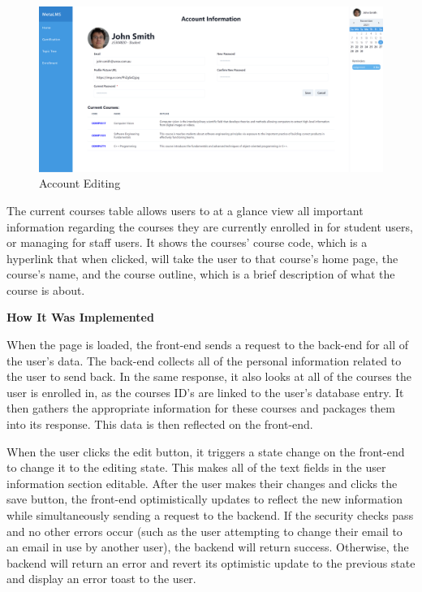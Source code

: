 \begin{figure}[h!]
    \centering
    \includegraphics[scale=0.1]{images/accounts-account-management-edit.png}
    \caption{Account Editing}
\end{figure}

The current courses table allows users to at a glance view all important information regarding the courses they are currently enrolled in for student users, or managing for staff users. It shows the courses' course code, which is a hyperlink that when clicked, will take the user to that course's home page, the course's name, and the course outline, which is a brief description of what the course is about.

\textbf{How It Was Implemented}

When the page is loaded, the front-end sends a request to the back-end for all of the user's data. The back-end collects all of the personal information related to the user to send back. In the same response, it also looks at all of the courses the user is enrolled in, as the courses ID's are linked to the user's database entry. It then gathers the appropriate information for these courses and packages them into its response. This data is then reflected on the front-end.

When the user clicks the edit button, it triggers a state change on the front-end to change it to the editing state. This makes all of the text fields in the user information section editable. After the user makes their changes and clicks the save button, the front-end optimistically updates to reflect the new information while simultaneously sending a request to the backend. If the security checks pass and no other errors occur (such as the user attempting to change their email to an email in use by another user), the backend will return success. Otherwise, the backend will return an error and revert its optimistic update to the previous state and display an error toast to the user.

